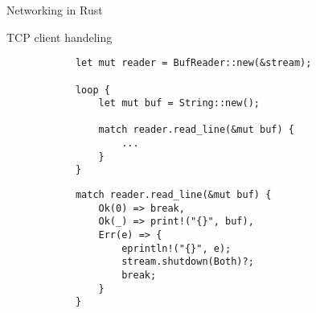 \begin{frame}[fragile]{Networking in Rust}

    \begin{block}{TCP client handeling}
        \begin{overprint}
            \begin{verbatim}
            let mut reader = BufReader::new(&stream);
            
            loop {
                let mut buf = String::new();
            
                match reader.read_line(&mut buf) {
                    ...
                }
            }
            \end{verbatim}

            \begin{verbatim}
            match reader.read_line(&mut buf) {
                Ok(0) => break,
                Ok(_) => print!("{}", buf),
                Err(e) => {
                    eprintln!("{}", e);
                    stream.shutdown(Both)?;
                    break;
                }
            }
            \end{verbatim}
        \end{overprint}
    \end{block}
\end{frame}
